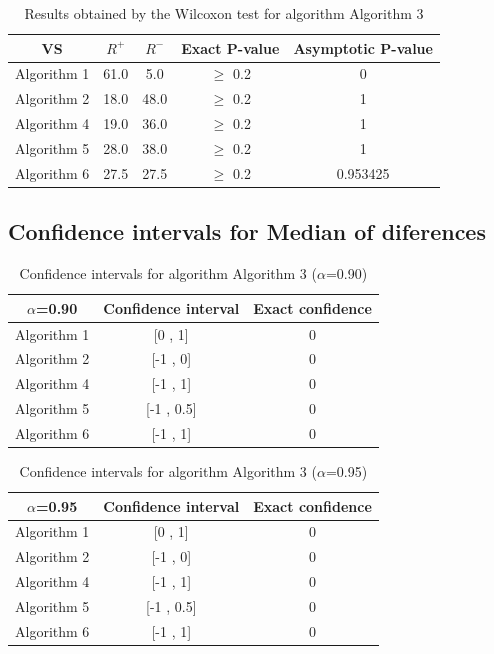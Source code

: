 \documentclass[a4paper,10pt]{article}
\begin{document}
\begin{table}[!htp]
\centering\small
\begin{tabular}{
|c|c|c|c|c|}
\hline
 VS & $R^{+}$ & $R^{-}$ & Exact P-value & Asymptotic P-value \\ \hline 
Algorithm 1 & 61.0 & 5.0 & $\geq$ 0.2 & 0\\ \hline 
Algorithm 2 & 18.0 & 48.0 & $\geq$ 0.2 & 1\\ \hline 
Algorithm 4 & 19.0 & 36.0 & $\geq$ 0.2 & 1\\ \hline 
Algorithm 5 & 28.0 & 38.0 & $\geq$ 0.2 & 1\\ \hline 
Algorithm 6 & 27.5 & 27.5 & $\geq$ 0.2 & 0.953425\\ \hline 

\end{tabular}
\caption{Results obtained by the Wilcoxon test for algorithm Algorithm 3}
\end{table}

\subsection{Confidence intervals for Median of diferences}

\begin{table}[!htp]
\centering\small
\begin{tabular}{
|c|c|c|}
\hline
 $\alpha$=0.90 & Confidence interval & Exact confidence \\ \hline 
Algorithm 1 & [0 , 1] & 0\\ \hline 
Algorithm 2 & [-1 , 0] & 0\\ \hline 
Algorithm 4 & [-1 , 1] & 0\\ \hline 
Algorithm 5 & [-1 , 0.5] & 0\\ \hline 
Algorithm 6 & [-1 , 1] & 0\\ \hline 

\end{tabular}
\caption{Confidence intervals for algorithm Algorithm 3 ($\alpha$=0.90)}
\end{table}
\begin{table}[!htp]
\centering\small
\begin{tabular}{
|c|c|c|}
\hline
 $\alpha$=0.95 & Confidence interval & Exact confidence \\ \hline 
Algorithm 1 & [0 , 1] & 0\\ \hline 
Algorithm 2 & [-1 , 0] & 0\\ \hline 
Algorithm 4 & [-1 , 1] & 0\\ \hline 
Algorithm 5 & [-1 , 0.5] & 0\\ \hline 
Algorithm 6 & [-1 , 1] & 0\\ \hline 

\end{tabular}
\caption{Confidence intervals for algorithm Algorithm 3 ($\alpha$=0.95)}
\end{table}
\end{document}
